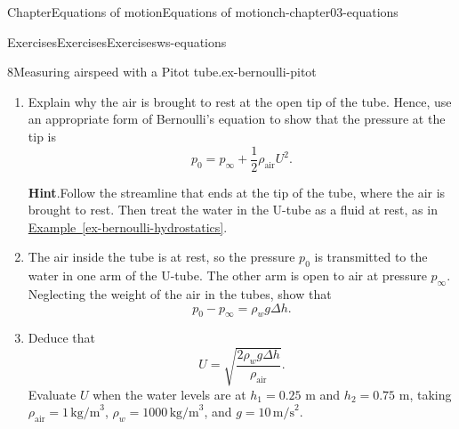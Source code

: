 \documentclass[oneside,10pt,]{book}
\newcommand{\blocktitlefont}{\relax}
\newcommand{\xreffont}{\relax}
\numberwithin{equation}{section}
\begin{document}
\begin{chapterptx}{Chapter}{Equations of motion}{}{Equations of motion}{}{}{ch-chapter03-equations}
\begin{exercises-section}{Exercises}{Exercises}{}{Exercises}{}{}{ws-equations}
\begin{divisionexercise}{8}{Measuring airspeed with a Pitot tube.}{}{ex-bernoulli-pitot}
\begin{enumerate}[font=\bfseries,label=(\alph*),ref=\alph*]%
\item{}Explain why the air is brought to rest at the open tip of the tube. Hence, use an appropriate form of Bernoulli's equation to show that the pressure at the tip is%
\begin{equation*}
p_0 = p_\infty + \frac12 \rho_\text{air} U^2.
\end{equation*}
%
\par\smallskip%
\noindent\textbf{\blocktitlefont Hint}.\hypertarget{ex-bernoulli-pitot-3-2}{}\quad{}Follow the streamline that ends at the tip of the tube, where the air is brought to rest. Then treat the water in the U-tube as a fluid at rest, as in \hyperref[ex-bernoulli-hydrostatics]{Example~{\xreffont\ref{ex-bernoulli-hydrostatics}}}.%
\item{}The air inside the tube is at rest, so the pressure \(p_0\) is transmitted to the water in one arm of the U-tube. The other arm is open to air at pressure \(p_\infty\). Neglecting the weight of the air in the tubes, show that%
\begin{equation*}
p_0 - p_\infty = \rho_w g \Delta h.
\end{equation*}
%
\item{}Deduce that%
\begin{equation*}
U = \sqrt{\frac{2 \rho_w g \Delta h}{\rho_\text{air}}}.
\end{equation*}
Evaluate \(U\) when the water levels are at \(h_1 = 0.25\) m and \(h_2 =
0.75\) m, taking \(\rho_\text{air} = 1\,\text{kg/m}^3\), \(\rho_w = 1000\,\text{kg/m}^3\), and \(g = 10\,\text{m/s}^2\).%
\end{enumerate}%
\end{divisionexercise}%
\end{exercises-section}
\end{chapterptx}
%
%
\typeout{************************************************}
\typeout{************************************************}
%
\end{document}
